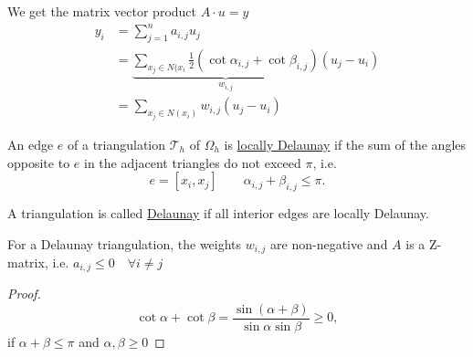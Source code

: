 \begin{remark}
\label{thm:stiffnessmatrixlemmaremark}
	We get the matrix vector product $A\cdot u = y$
	\begin{align*}
		y_{i} &= \sum_{j=1}^{n}{a_{i,j}u_{j}}\\
			  &= \underbrace{\sum_{x_{j}\in N(x_{i}}^{}{\frac{1}{2}(\cot \alpha_{i,j}+ \cot \beta_{i,j})}}_{w_{i,j}}(u_{j}-u_{i}) \\
			  &= \sum_{x_{j}\in N(x_{i})}^{}{w_{i,j}(u_{j}- u_{i})}
	\end{align*}
\end{remark}

\begin{definition}
\label{thm:locallydelaunay}
	An edge $e$ of a triangulation $\mathcal{T}_{h}$ of $\Omega _{h}$ is \underline{locally Delaunay} if the sum of the angles opposite to $e$ in the adjacent triangles do not exceed $\pi $, i.e.
	\[
		e = [x_{i}, x_{j}] \qquad \alpha_{i,j} + \beta_{i,j} \leq \pi 
	.\] 
\end{definition}

\begin{definition}
\label{thm:delaunay}
	A triangulation is called \underline{Delaunay} if all interior edges are locally Delaunay.
\end{definition}

\begin{lemma}
\label{thm:delaunaylemma}
	For a Delaunay triangulation, the weights $w_{i,j}$ are non-negative and $A$ is a Z-matrix, i.e. $a_{i,j} \leq 0 \quad \forall i \neq j$
\end{lemma}

\begin{proof}
\label{thm:delaunaylemmaproof}
	\[
		\cot \alpha + \cot \beta = \frac{\sin(\alpha+\beta)}{\sin \alpha \sin \beta} \geq 0
	,\] 	
	if $\alpha + \beta \leq \pi $ and $\alpha,\beta \geq 0 $
\end{proof}

